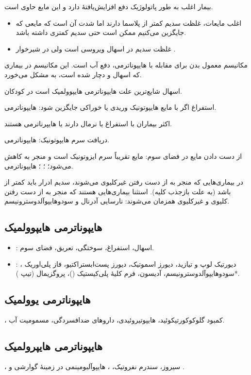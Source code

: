 \documentclass[12pt,a4paper]{article}
\begin{document}
بیمار اغلب به طور پاتولوژیک دفع افزایش‌یافتهٔ  دارد و این مایع حاوی  است.
\begin{itemize}
\item اغلب مایعات، غلظت سدیم کمتر از پلاسما دارند اما شدت آن است که مایعی که جایگزین می‌کنیم ممکن است حتی سدیم کمتری داشته باشد.
\item غلظت سدیم در اسهال ویروسی  است ولی در شیرخوار .
\end{itemize}
مکانیسم معمول بدن برای مقابله با هایپوناترمی، دفع آب است. این مکانیسم در بیماری که اسهال و دچار  شده است، به مشکل می‌خورد.

اسهال شایع‌ترین علت هایپوناترمی هایپوولمیک است در کودکان.

استفراغ اگر با مایع هایپوتونیک وریدی یا خوراکی جایگزین شود: هایپوناترمی.

اکثر بیماران با استفراغ یا  نرمال دارند یا هایپرناترمی هستند.

دریافت سرم هایپوتونیک: هایپوناترمی.

از دست دادن مایع در فضای سوم: مایع تقریباً سرم ایزوتونیک است و منجر به کاهش  می‌شود؛ ؛ ؛ هایپوناترمی.

در بیماری‌هایی که منجر به از دست رفتن غیرکلیوی  می‌شوند، سدیم ادرار باید کمتر از  باشد (به علت بازجذب کلیه). استثنا بیماری‌هایی هستند که منجر به از دست رفتن کلیوی و غیرکلیوی همزمان  می‌شوند: نارسایی آدرنال و سودوهایپوآلدوسترونیسم.

\subsection*{هایپوناترمی هایپوولمیک}
\begin{itemize}
\item {}: اسهال، استفراغ، سوختگی، تعریق، فضای سوم.
\item {}: دیورتیک لوپ و تیازید، دیورز اسموتیک، دیورز پست‌ابستراکتیو، فاز پلی‌اوریک ، سودوهایپوآلدوسترونیسم، آدیسون، فرم  کلیهٔ پلی‌کیستیک ()،  پروگزیمال (تیپ )*.
\end{itemize}
\subsection*{هایپوناترمی یوولمیک}
، کمبود گلوکوکورتیکوئید، هایپوتیروئیدی، داروهای ضدافسردگی، مسمومیت آب.

\subsection*{هایپوناترمی هایپرولمیک}
، سیروز، سندرم نفروتیک، ، هایپوآلبومینمی در زمینهٔ  گوارشی و .
\end{document}
